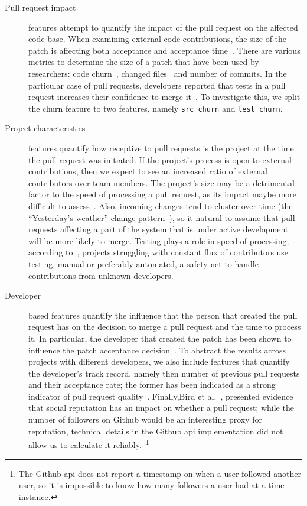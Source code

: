 \documentclass{sig-alternate}
\begin{document}
\begin{description}

  \item[Pull request impact] features attempt to quantify the impact of the
    pull request on the affected code base. When examining external code
    contributions, the size of the patch is affecting both acceptance and
    acceptance time~\cite{Weiss08}. There are various metrics to determine the
    size of a patch that have been used by researchers: code
    churn~\cite{Nagap05, Ratzi07}, changed files~\cite{Nagap05} and number of
    commits. In the particular case of pull requests, developers
    reported that tests in a pull request increases their confidence to merge
    it~\cite{Pham13}. To investigate this, we split the churn feature to two
    features, namely \texttt{src\_churn} and \texttt{test\_churn}.

  \item[Project characteristics] features quantify how receptive to pull
    requests is the project at the time the pull request was initiated.
    If the project's process is open to external contributions, then
    we expect to see an increased ratio of external contributors over
    team members. The project's size may be a detrimental
    factor to the speed of processing a pull request, as its impact maybe
    more difficult to assess~.
    Also, incoming changes tend to cluster over time (the ``Yesterday's
    weather'' change pattern~\cite{Girba04}), so it natural to assume
    that pull requests affecting a part of the system that is under
    active development will be more likely to merge.
    Testing plays a role in speed of processing; according
    to~\cite{Pham13}, projects struggling with constant flux of contributors 
    use testing, manual or preferably automated, a safety net to handle
    contributions from unknown developers.

  \item[Developer] based features quantify the influence that the person that
    created the pull request has on the decision to merge a pull request and
    the time to process it. In particular, the developer that created the patch
    has been shown to influence the patch acceptance decision~\cite{Jeong09}. To
    abstract the results across projects with different developers, we also
    include features that quantify the developer's track record, namely then
    number of previous pull requests and their acceptance rate; the former has
    been indicated as a strong indicator of pull request quality~\cite{Pham13}.
    Finally,Bird et al.~\cite{Bird07}, presented evidence that social
    reputation has an impact on whether a pull request; while the number of
    followers on Github would be an interesting proxy for reputation, technical
    details in the Github {\sc api} implementation did not allow us to calculate
    it reliably.~\footnote{The Github {\sc api} does not report a timestamp on
    when a user followed another user, so it is impossible to know how many
    followers a user had at a time instance.}

\end{description}
\end{document}
